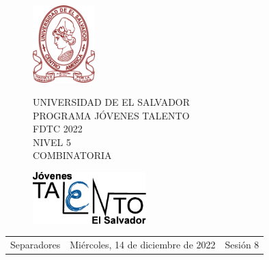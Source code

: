 \documentclass[12pt]{article}
\newcommand{\tema}{Separadores}
\newcommand{\fecha}{Miércoles, 14 de diciembre de 2022}
\newcommand{\sesion}{Sesión 8}
\begin{document}
\thispagestyle{empty}

\begin{figure}[h] 
	\begin{minipage}[b]{0.26\textwidth}
		\begin{center}
			\includegraphics[height=3cm]{Logos/UES.png}
			\par\end{center}
	\end{minipage} 
	\begin{minipage}[b]{0.46\textwidth}
		\begin{center}
			UNIVERSIDAD DE EL SALVADOR\\ [0.1cm]
			PROGRAMA JÓVENES TALENTO\\ [0.1cm]
	        FDTC 2022\\ [0.1cm]
                NIVEL 5\\ [0.1cm]
			COMBINATORIA 
			\par\end{center}
	\end{minipage} 
	\begin{minipage}[b]{0.05\textwidth}
		\begin{center}
			\includegraphics[height=2cm]{Logos/LOGO PJT.png}
			\par\end{center}
	\end{minipage}
\end{figure}

\begin{center}
    \begin{tabular}{p{4.5cm} p{7cm} p{4.5cm}}
        \tema & \centering\fecha & \hfill\sesion
    \end{tabular}
\end{center}
\end{document}

